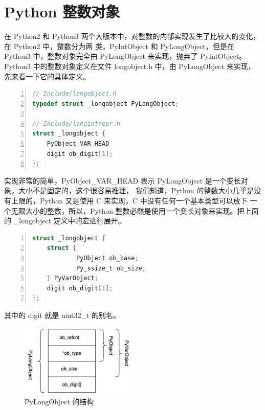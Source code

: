 \chapter{Python 整数对象}
在 Python2 和 Python3 两个大版本中，对整数的内部实现发生了比较大的变化，在 Python2 中，整数分为两
类，PyIntObject 和 PyLongObject，但是在 Python3 中，整数对象完全由 PyLongObject 来实现，抛弃了
PyIntObject。Python3 中的整数对象定义在文件 longobject.h 中，由 PyLongObject 来实现，先来看一下它的具体定义。

\begin{lstlisting}[language=C, numbers=left, numbersep=1em, numberstyle=\footnotesize , breaklines=true]
// Include/longobject.h
typedef struct _longobject PyLongObject; 

// Include/longintrepr.h
struct _longobject {
    PyObject_VAR_HEAD
    digit ob_digit[1];
};
\end{lstlisting}

实现非常的简单，PyObject\_VAR\_HEAD 表示 PyLongObject 是一个变长对象，大小不是固定的，这个很容易推理，
我们知道，Python 的整数大小几乎是没有上限的，Python 又是使用 C 来实现，C 中没有任何一个基本类型可以放下
一个无限大小的整数，所以，Python 整数必然是使用一个变长对象来实现。把上面的 \_longobject 定义中的宏进行展开。

\begin{lstlisting}[language=C, numbers=left, numbersep=1em, numberstyle=\footnotesize , breaklines=true]
struct _longobject {
	struct {
    		PyObject ob_base;
    		Py_ssize_t ob_size;
	} PyVarObject;
    digit ob_digit[1];
};
\end{lstlisting}

其中的 digit 就是 uint32\_t 的别名。

\begin{figure}[htbp]
\centering
  \includegraphics[width=0.5\textwidth]{pictures/ch5_01.png}
  \caption{PyLongObject 的结构 \label{fig:scatter}}
\end{figure}

